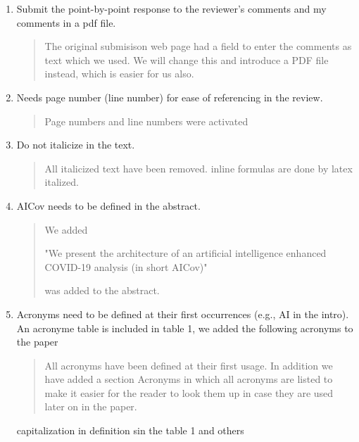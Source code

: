 \begin{enumerate}

\item \PROGRESS Submit the point-by-point response to the reviewer's comments and my comments in a pdf file.

\begin{quote}
The original submisison web page had a field to enter the comments as text which we used. We will change this and introduce a PDF file instead, which is easier for us also.
\end{quote}



\item \DONE Needs page number (line number) for ease of referencing in the review.

\begin{quote}
Page numbers and line numbers were activated
\end{quote}


\item \DONE Do not italicize in the text.

\begin{quote}
All italicized text have been removed.
inline formulas are done by latex italized. 
\end{quote}


\item \DONE AICov needs to be defined in the abstract.

\begin{quote}
We added 

"We present the architecture of an artificial intelligence enhanced COVID-19 analysis (in short AICov)" 

was added to the abstract.
\end{quote}


\item \PROGRESS Acronyms need to be defined at their first occurrences (e.g., AI in the intro). An acronyme table is included in table 1, we added the following acronyms to the paper

\begin{quote}
    All acronyms have been defined at their first usage. In addition we have added a section Acronyms in which all acronyms are listed to make it easier for the reader to look them up in case they are used later on in the paper.
\end{quote}

\DOIT capitalization in definition sin the table 1 and others


\end{enumerate}

